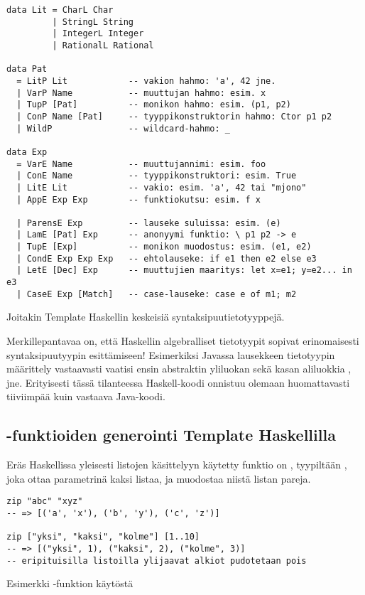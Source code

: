\begin{listing}[H]
\begin{verbatim}
data Lit = CharL Char
         | StringL String
         | IntegerL Integer
         | RationalL Rational

data Pat
  = LitP Lit            -- vakion hahmo: 'a', 42 jne.
  | VarP Name           -- muuttujan hahmo: esim. x
  | TupP [Pat]          -- monikon hahmo: esim. (p1, p2)
  | ConP Name [Pat]     -- tyyppikonstruktorin hahmo: Ctor p1 p2
  | WildP               -- wildcard-hahmo: _

data Exp
  = VarE Name           -- muuttujannimi: esim. foo
  | ConE Name           -- tyyppikonstruktori: esim. True
  | LitE Lit            -- vakio: esim. 'a', 42 tai "mjono"
  | AppE Exp Exp        -- funktiokutsu: esim. f x

  | ParensE Exp         -- lauseke suluissa: esim. (e)
  | LamE [Pat] Exp      -- anonyymi funktio: \ p1 p2 -> e
  | TupE [Exp]          -- monikon muodostus: esim. (e1, e2)
  | CondE Exp Exp Exp   -- ehtolauseke: if e1 then e2 else e3
  | LetE [Dec] Exp      -- muuttujien maaritys: let x=e1; y=e2... in e3
  | CaseE Exp [Match]   -- case-lauseke: case e of m1; m2
\end{verbatim}
\label{lst:syntax-tree-types}
\caption{Joitakin Template Haskellin keskeisiä syntaksipuutietotyyppejä.}
\end{listing}

Merkillepantavaa on,
että Haskellin algebralliset tietotyypit sopivat erinomaisesti syntaksipuutyypin esittämiseen!
Esimerkiksi Javassa lausekkeen tietotyypin määrittely vastaavasti vaatisi ensin abstraktin yliluokan
 sekä kasan aliluokkia ,
 jne.
Erityisesti tässä tilanteessa Haskell-koodi onnistuu olemaan huomattavasti tiiviimpää kuin vastaava Java-koodi.

\subsection{-funktioiden generointi Template Haskellilla}

Eräs Haskellissa yleisesti listojen käsittelyyn käytetty funktio on ,
tyypiltään ,
joka ottaa parametrinä kaksi listaa,
ja muodostaa niistä listan pareja.

\begin{listing}[H]
\begin{verbatim}
zip "abc" "xyz"
-- => [('a', 'x'), ('b', 'y'), ('c', 'z')]

zip ["yksi", "kaksi", "kolme"] [1..10]
-- => [("yksi", 1), ("kaksi", 2), ("kolme", 3)]
-- eripituisilla listoilla ylijaavat alkiot pudotetaan pois
\end{verbatim}
\label{lst:zip-example}
\caption{Esimerkki -funktion käytöstä}
\end{listing}

